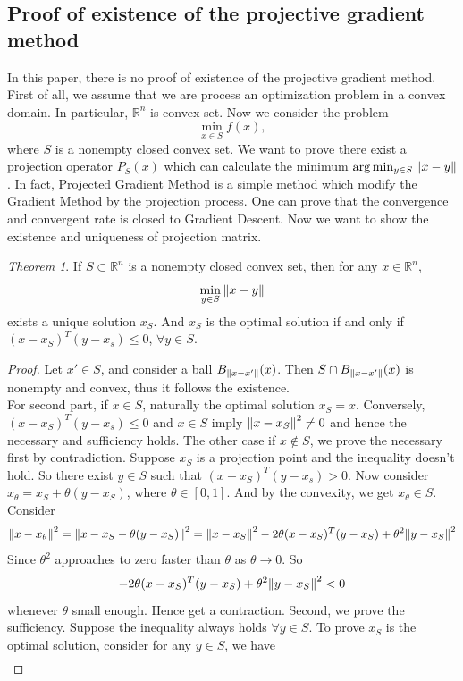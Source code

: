 \documentclass[12pt]{article}
\theoremstyle{remark}
\newtheorem{theorem}{Theorem}
\def\to{\rightarrow}
\def\bR{\mathbb R}
\begin{document}
\begin{CJK}{UTF8}{bsmi}
\subsection{Proof of existence of the projective gradient method}
In this paper, there is no proof of existence of the projective gradient method. First of all, we assume that we are process an optimization problem in a convex domain. In particular, $\bR^n$ is convex set. Now we consider the problem
$$
\min_{x\in S} f(x),
$$
where $S$ is a nonempty closed convex set. We want to prove there exist a projection operator $P_S(x)$ which can calculate the minimum $\arg \min_{y \in S}\norm{x-y}$ . In fact, Projected Gradient Method is a simple method which modify the Gradient Method by the projection process. One can prove that the convergence and convergent rate is closed to Gradient Descent. Now we want to show the existence and uniqueness of projection matrix. 
\begin{theorem}
If $S\subset \bR^n$ is a nonempty closed convex set, then for any $x\in \bR^n$,
$$
\min_{y\in S} \norm{x-y}
$$
exists a unique solution $x_S$. And $x_S$ is the optimal solution if and only if $(x-x_S)^T(y-x_s)\leq 0$, $\forall y \in S$.
\end{theorem}
\begin{proof}
Let $x'\in S$, and consider a ball $B_{\norm{x-x'}}(x)$. Then $S\cap B_{\norm{x-x'}}(x)$ is nonempty and convex, thus it follows the existence.\\
For second part, if $x\in S$, naturally the optimal solution $x_S=x$. Conversely, $(x-x_S)^T(y-x_s)\leq 0$ and $x\in S$ imply $\norm{x-x_S}^2\neq 0$ and hence the necessary and sufficiency holds. The other case if $x\notin S$, we prove the necessary first by contradiction. Suppose $x_S$ is a projection point and the inequality doesn't hold. So there exist $y \in S$ such that $(x-x_S)^T(y-x_s) > 0$. Now consider $x_\theta = x_S + \theta(y-x_S)$, where $\theta \in [0,1]$. And by the convexity, we get $x_\theta \in S$. Consider
$$
\norm{ x-x_\theta }^2 = \norm{ x-x_S -\theta(y-x_S)  }^2 = \norm{ x-x_S  }^2 -2\theta (x-x_S)^T(y-x_S) + \theta^2 \norm{y-x_S}^2
$$
Since $\theta^2$ approaches to zero faster than $\theta$ as $\theta \to 0$. So
$$
-2\theta (x-x_S)^T(y-x_S) + \theta^2 \norm{y-x_S}^2 < 0
$$ 
whenever $\theta$ small enough. Hence get a contraction. Second, we prove the sufficiency. Suppose the inequality always holds $\forall y \in S$. To prove $x_S$ is the optimal solution, consider for any $y\in S$, we have
\begin{eqnarray*}

\end{eqnarray*}
\end{proof}
\end{CJK}
\end{document}
